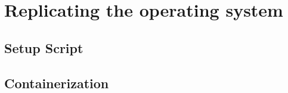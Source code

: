 \section{Replicating the operating system}
        \subsection{Setup Script}
        \subsection{Containerization}
